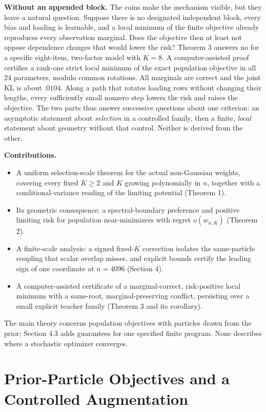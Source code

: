 \documentclass{article}
\providecommand{\tightlist}{\setlength{\itemsep}{0pt}\setlength{\parskip}{0pt}}
\begin{document}
\textbf{Without an appended block.} The coins make the mechanism
visible, but they leave a natural question. Suppose there is no
designated independent block, every bias and loading is learnable, and a
local minimum of the finite objective already reproduces every
observation marginal. Does the objective then at least not oppose
dependence changes that would lower the risk? Theorem 3 answers no for a
specific eight-item, two-factor model with \(K=8\). A computer-assisted
proof certifies a rank-one strict local minimum of the exact population
objective in all 24 parameters, modulo common rotations. All marginals
are correct and the joint KL is about \(.0104\). Along a path that
rotates loading rows without changing their lengths, every sufficiently
small nonzero step lowers the risk and raises the objective. The two
parts thus answer successive questions about one criterion: an
asymptotic statement about \emph{selection} in a controlled family, then
a finite, \emph{local} statement about geometry without that control.
Neither is derived from the other.

\textbf{Contributions.}

\begin{itemize}
\tightlist
\item
  A uniform selection-scale theorem for the actual non-Gaussian weights,
  covering every fixed \(K\ge2\) and \(K\) growing polynomially in
  \(n\), together with a conditional-variance reading of the limiting
  potential (Theorem 1).
\item
  Its geometric consequence: a spectral-boundary preference and positive
  limiting risk for population near-minimizers with regret
  \(o(w_{n,K})\) (Theorem 2).
\item
  A finite-scale analysis: a signed fixed-\(K\) correction isolates the
  same-particle coupling that scalar overlap misses, and explicit bounds
  certify the leading sign of one coordinate at \(n=4096\) (Section 4).
\item
  A computer-assisted certificate of a marginal-correct, risk-positive
  local minimum with a same-root, marginal-preserving conflict,
  persisting over a small explicit teacher family (Theorem 3 and its
  corollary).
\end{itemize}

The main theory concerns population objectives with particles drawn from
the prior; Section 4.3 adds guarantees for one specified finite program.
None describes where a stochastic optimizer converges.

\section{Prior-Particle Objectives and a Controlled
Augmentation}\label{prior-particle-objectives-and-a-controlled-augmentation}
\end{document}
